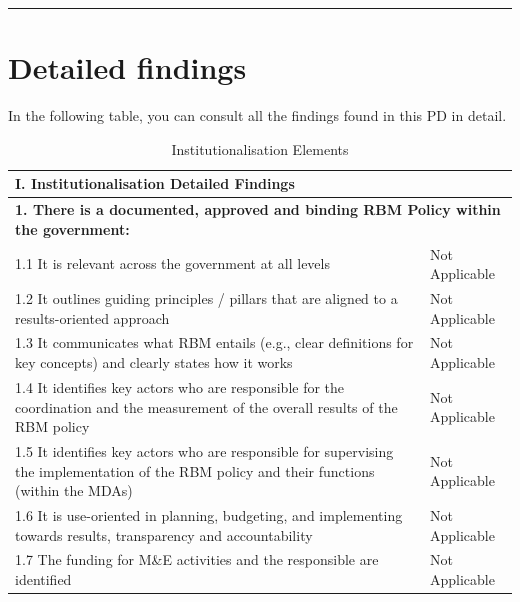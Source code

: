 \documentclass[
  10pt,
]{book}
\begin{document}
\begin{center}\rule{0.5\linewidth}{0.5pt}\end{center}

\hypertarget{appendixB}{%
\chapter{Detailed findings}\label{appendixB}}

In the following table, you can consult all the findings found in this PD in detail.

\begin{table}

\caption{\label{tab:unnamed-chunk-12}Institutionalisation Elements}
\centering
\begin{tabular}[t]{l|l}
\hline
I. Institutionalisation Detailed Findings &  \\
\hline
\multicolumn{2}{l}{\textbf{1. There is a documented, approved and binding RBM Policy within the government:}}\\
\hline
\hspace{1em}1.1 It is relevant across the government at all levels & Not Applicable\\
\hline
\hspace{1em}1.2 It outlines guiding principles / pillars that are aligned to a results-oriented approach & Not Applicable\\
\hline
\hspace{1em}1.3 It communicates what RBM entails (e.g., clear definitions for key concepts) and clearly states how it works & Not Applicable\\
\hline
\hspace{1em}1.4 It identifies key actors who are responsible for the coordination and the measurement of the overall results of the RBM policy & Not Applicable\\
\hline
\hspace{1em}1.5 It identifies key actors who are responsible for supervising the implementation of the RBM policy and their functions (within the MDAs) & Not Applicable\\
\hline
\hspace{1em}1.6 It is use-oriented in planning, budgeting, and implementing towards results, transparency and accountability & Not Applicable\\
\hline
\hspace{1em}1.7 The funding for M\&E activities and the responsible are identified & Not Applicable\\

\end{tabular}
\end{table}
\end{document}
